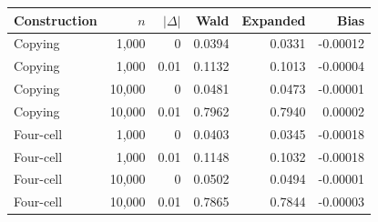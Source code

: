\begin{tabular}{@{}lrrrrr@{}}\toprule
Construction & \(n\) & \(|\Delta|\) & Wald & Expanded & Bias\\\midrule
Copying & 1,000 & 0 & 0.0394 & 0.0331 & -0.00012\\
Copying & 1,000 & 0.01 & 0.1132 & 0.1013 & -0.00004\\
Copying & 10,000 & 0 & 0.0481 & 0.0473 & -0.00001\\
Copying & 10,000 & 0.01 & 0.7962 & 0.7940 & 0.00002\\
Four-cell & 1,000 & 0 & 0.0403 & 0.0345 & -0.00018\\
Four-cell & 1,000 & 0.01 & 0.1148 & 0.1032 & -0.00018\\
Four-cell & 10,000 & 0 & 0.0502 & 0.0494 & -0.00001\\
Four-cell & 10,000 & 0.01 & 0.7865 & 0.7844 & -0.00003\\
\bottomrule\end{tabular}
